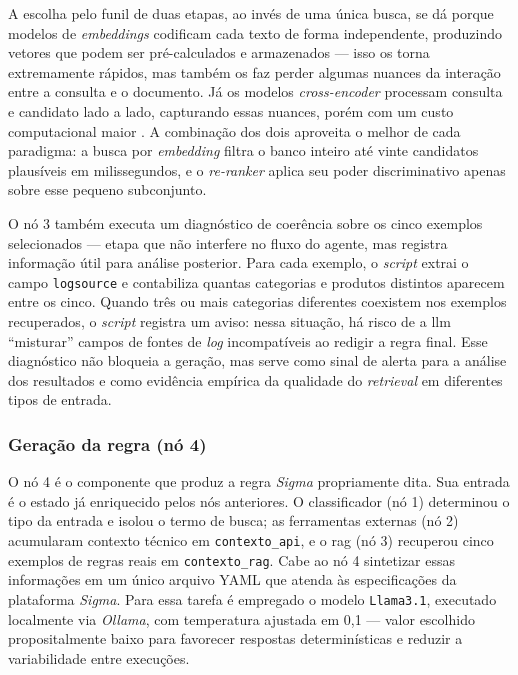 A escolha pelo funil de duas etapas, ao invés de uma única busca, se dá porque modelos de \textit{embeddings} codificam cada texto de forma independente, produzindo vetores que podem ser pré-calculados e armazenados --- isso os torna extremamente rápidos, mas também os faz perder algumas nuances da interação entre a consulta e o documento. 
Já os modelos \textit{cross-encoder} processam consulta e candidato lado a lado, capturando essas nuances, porém com um custo computacional maior \cite{nogueira2019passage}. 
A combinação dos dois aproveita o melhor de cada paradigma: a busca por \textit{embedding} filtra o banco inteiro até vinte candidatos plausíveis em milissegundos, e o \textit{re-ranker} aplica seu poder discriminativo apenas sobre esse pequeno subconjunto. 

O nó 3 também executa um diagnóstico de coerência sobre os cinco exemplos selecionados --- etapa que não interfere no fluxo do agente, mas registra informação útil para análise posterior. 
Para cada exemplo, o \textit{script} extrai o campo \texttt{logsource} e contabiliza quantas categorias e produtos distintos aparecem entre os cinco. 
Quando três ou mais categorias diferentes coexistem nos exemplos recuperados, o \textit{script} registra um aviso: nessa situação, há risco de a \gls{llm} ``misturar'' campos de fontes de \textit{log} incompatíveis ao redigir a regra final. 
Esse diagnóstico não bloqueia a geração, mas serve como sinal de alerta para a análise dos resultados e como evidência empírica da qualidade do \textit{retrieval} em diferentes tipos de entrada.


\subsubsection{Geração da regra (nó 4)}

O nó 4 é o componente que produz a regra \textit{Sigma} propriamente dita. 
Sua entrada é o estado já enriquecido pelos nós anteriores. 
O classificador (nó 1) determinou o tipo da entrada e isolou o termo de busca; as ferramentas externas (nó 2) acumularam contexto técnico em \texttt{contexto\_api}, e o \gls{rag} (nó 3) recuperou cinco exemplos de regras reais em \texttt{contexto\_rag}. 
Cabe ao nó 4 sintetizar essas informações em um único arquivo YAML que atenda às especificações da plataforma \textit{Sigma}. 
Para essa tarefa é empregado o modelo \texttt{Llama3.1}, executado localmente via \textit{Ollama}, com temperatura ajustada em 0,1 --- valor escolhido propositalmente baixo para favorecer respostas determinísticas e reduzir a variabilidade entre execuções.

